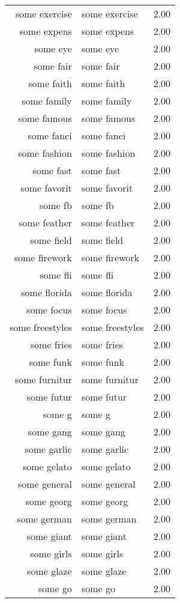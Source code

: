\begin{table}[ht]
\begin{tabular}{rlr}
  some exercise & some exercise & 2.00 \\ 
  some expens & some expens & 2.00 \\ 
  some eye & some eye & 2.00 \\ 
  some fair & some fair & 2.00 \\ 
  some faith & some faith & 2.00 \\ 
  some family & some family & 2.00 \\ 
  some famous & some famous & 2.00 \\ 
  some fanci & some fanci & 2.00 \\ 
  some fashion & some fashion & 2.00 \\ 
  some fast & some fast & 2.00 \\ 
  some favorit & some favorit & 2.00 \\ 
  some fb & some fb & 2.00 \\ 
  some feather & some feather & 2.00 \\ 
  some field & some field & 2.00 \\ 
  some firework & some firework & 2.00 \\ 
  some fli & some fli & 2.00 \\ 
  some florida & some florida & 2.00 \\ 
  some focus & some focus & 2.00 \\ 
  some freestyles & some freestyles & 2.00 \\ 
  some fries & some fries & 2.00 \\ 
  some funk & some funk & 2.00 \\ 
  some furnitur & some furnitur & 2.00 \\ 
  some futur & some futur & 2.00 \\ 
  some g & some g & 2.00 \\ 
  some gang & some gang & 2.00 \\ 
  some garlic & some garlic & 2.00 \\ 
  some gelato & some gelato & 2.00 \\ 
  some general & some general & 2.00 \\ 
  some georg & some georg & 2.00 \\ 
  some german & some german & 2.00 \\ 
  some giant & some giant & 2.00 \\ 
  some girls & some girls & 2.00 \\ 
  some glaze & some glaze & 2.00 \\ 
  some go & some go & 2.00 \\ 

\end{tabular}
\end{table}

